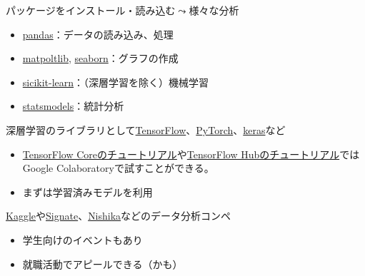 \documentclass[
  xelatex,
  ja=standard]{bxjsarticle}
\providecommand{\tightlist}{%
  \setlength{\itemsep}{0pt}\setlength{\parskip}{0pt}}\usepackage{longtable,booktabs,array}
\begin{document}
パッケージをインストール・読み込む\(\leadsto\)様々な分析

\begin{itemize}
\tightlist
\item
  \href{https://pandas.pydata.org/}{pandas}：データの読み込み、処理
\item
  \href{https://matplotlib.org/}{matpoltlib},
  \href{https://seaborn.pydata.org/}{seaborn}：グラフの作成
\item
  \href{https://scikit-learn.org/stable/}{sicikit-learn}：（深層学習を除く）機械学習
\item
  \href{https://www.statsmodels.org/stable/}{statsmodels}：統計分析
\end{itemize}

深層学習のライブラリとして\href{https://www.tensorflow.org/}{TensorFlow}、\href{https://pytorch.org/}{PyTorch}、\href{https://keras.io/ja/}{keras}など

\begin{itemize}
\tightlist
\item
  \href{https://www.tensorflow.org/tutorials}{TensorFlow
  Coreのチュートリアル}や\href{https://www.tensorflow.org/hub/tutorials}{TensorFlow
  Hubのチュートリアル}ではGoogle Colaboratoryで試すことができる。
\item
  まずは学習済みモデルを利用
\end{itemize}

\href{https://www.kaggle.com/}{Kaggle}や\href{https://signate.jp/}{Signate}、\href{https://www.nishika.com/}{Nishika}などのデータ分析コンペ

\begin{itemize}
\tightlist
\item
  学生向けのイベントもあり
\item
  就職活動でアピールできる（かも）
\end{itemize}


  
\end{document}
